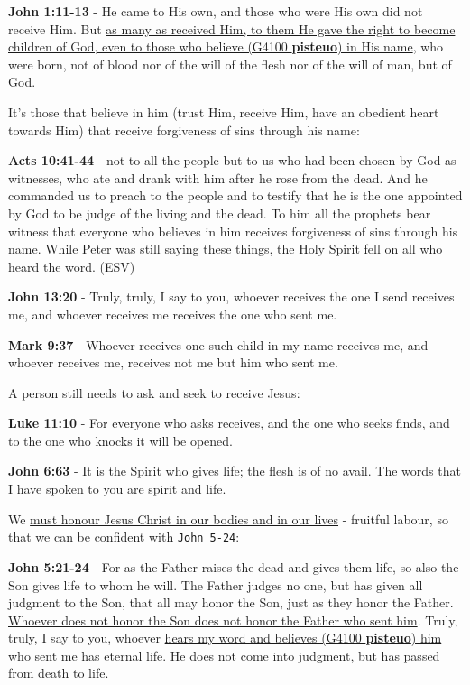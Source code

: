 \documentclass[11pt]{article}
\begin{document}
\textbf{John 1:11-13} - He came to His own, and those who were His own did not receive Him. But \uline{as many as received Him, to them He gave the right to become children of God, even to those who believe (G4100 \textbf{pisteuo}) in His name}, who were born, not of blood nor of the will of the flesh nor of the will of man, but of God.

It's those that believe in him (trust Him, receive Him, have an obedient heart towards Him) that receive forgiveness of sins through his name:

\textbf{Acts 10:41-44} - not to all the people but to us who had been chosen by God as witnesses, who ate and drank with him after he rose from the dead. And he commanded us to preach to the people and to testify that he is the one appointed by God to be judge of the living and the dead. To him all the prophets bear witness that everyone who believes in him receives forgiveness of sins through his name. While Peter was still saying these things, the Holy Spirit fell on all who heard the word. (ESV)

\textbf{John 13:20} - Truly, truly, I say to you, whoever receives the one I send receives me, and whoever receives me receives the one who sent me.

\textbf{Mark 9:37} - Whoever receives one such child in my name receives me, and whoever receives me, receives not me but him who sent me.

A person still needs to ask and seek to receive Jesus:

\textbf{Luke 11:10} - For everyone who asks receives, and the one who seeks finds, and to the one who knocks it will be opened.

\textbf{John 6:63} - It is the Spirit who gives life; the flesh is of no avail. The words that I have spoken to you are spirit and life.

We \uline{must honour Jesus Christ in our bodies and in our lives} - fruitful labour, so that we can be confident with \texttt{John 5-24}:

\textbf{John 5:21-24} - For as the Father raises the dead and gives them life, so also the Son gives life to whom he will. The Father judges no one, but has given all judgment to the Son, that all may honor the Son, just as they honor the Father. \uline{Whoever does not honor the Son does not honor the Father who sent him}. Truly, truly, I say to you, whoever \uline{hears my word and believes (G4100 \textbf{pisteuo}) him who sent me has eternal life}. He does not come into judgment, but has passed from death to life.
\end{document}
